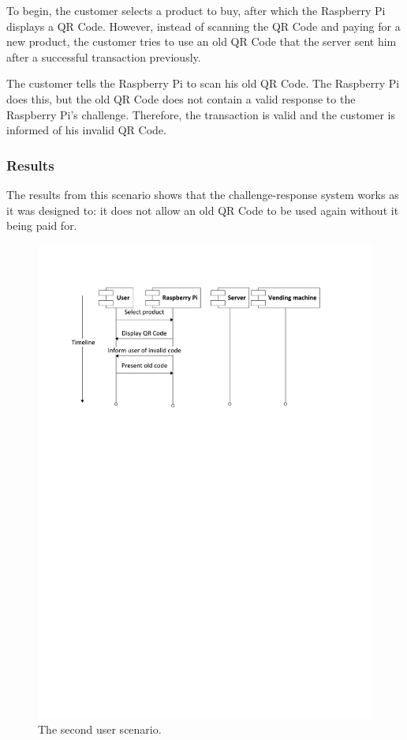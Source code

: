 To begin, the customer selects a product to buy, after which the Raspberry Pi displays a
QR Code. However, instead of scanning the QR Code and paying for a new product, the
customer tries to use an old QR Code that the server sent him after a successful
transaction previously. 

The customer tells the Raspberry Pi to scan his old QR Code. The Raspberry Pi does
this, but the old QR Code does not contain a valid response to the Raspberry Pi's
challenge. Therefore, the transaction is valid and the customer is informed of his
invalid QR Code.

\subsubsection{Results}

The results from this scenario shows that the challenge-response system works as it was
designed to: it does not allow an old QR Code to be used again without it being paid for. 

\begin{figure}
 \centering 
 \includegraphics[clip=true, trim = 0 550 0 70,
 scale=0.7]{user_story_2}
 \caption{The second user scenario.}
 \label{fig:test2}
\end{figure}

